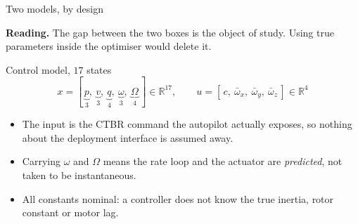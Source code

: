 \documentclass[10pt]{beamer}
\newcommand{\takeaway}[1]{\par\vfill{\footnotesize\textbf{Reading.} #1\par}}
\begin{document}
\begin{frame}{Two models, by design}
  \centering
  \takeaway{The gap between the two boxes is the object of study. Using true
    parameters inside the optimiser would delete it.}
\end{frame}

\begin{frame}{Control model, $17$ states}
  \[
    x=[\,\underbrace{p}_{3},\ \underbrace{v}_{3},\ \underbrace{q}_{4},\
        \underbrace{\omega}_{3},\ \underbrace{\Omega}_{4}\,]\in\mathbb{R}^{17},
    \qquad
    u=[\,c,\ \bar\omega_x,\ \bar\omega_y,\ \bar\omega_z\,]\in\mathbb{R}^{4}
  \]
  \begin{itemize}
    \item The input is the CTBR command the autopilot actually exposes, so
      nothing about the deployment interface is assumed away.
    \item Carrying $\omega$ and $\Omega$ means the rate loop and the actuator
      are \emph{predicted}, not taken to be instantaneous.
    \item All constants nominal: a controller does not know the true inertia,
      rotor constant or motor lag.
  \end{itemize}
\end{frame}
\end{document}
